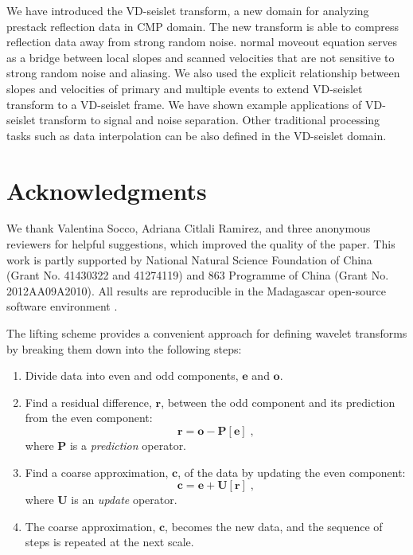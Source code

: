 We have introduced the VD-seislet transform, a new domain for
analyzing prestack reflection data in CMP domain. The new transform is
able to compress reflection data away from strong random
noise.   normal moveout
equation serves as a bridge between local slopes and scanned
velocities that are not sensitive to strong random noise and
aliasing. We also used the explicit relationship between slopes and
velocities of primary and multiple events to extend VD-seislet
transform to a VD-seislet frame. We have shown example applications of
VD-seislet transform to signal and noise separation. Other traditional
processing tasks such as data interpolation can be
also   defined in the VD-seislet domain.

\section{Acknowledgments}
We thank Valentina Socco, Adriana Citlali Ramirez, and three anonymous
reviewers for helpful suggestions, which improved the quality of the
paper. This work is partly supported by National Natural Science
Foundation of China (Grant No. 41430322 and 41274119) and 863
Programme of China (Grant No. 2012AA09A2010). All results are
reproducible in the Madagascar open-source software environment
\cite[]{m8r}.


The lifting scheme \cite[]{Sweldens95} provides a convenient approach
for defining wavelet transforms by breaking them down into the
following steps:
\begin{enumerate}
\item Divide data into even and odd components, $\mathbf{e}$ and
  $\mathbf{o}$.
\item Find a residual difference, $\mathbf{r}$, between the odd
  component and its prediction from the even component:
  \begin{equation}
    \label{eq:c}
    \mathbf{r}  = \mathbf{o} - \mathbf{P[e]}\;,
  \end{equation}
  where $\mathbf{P}$ is a \emph{prediction} operator.
\item Find a coarse approximation, $\mathbf{c}$, of the data by
  updating the even component:
  \begin{equation}
    \label{eq:r}
    \mathbf{c}  = \mathbf{e} + \mathbf{U[r]}\;,
  \end{equation}
  where $\mathbf{U}$ is an \emph{update} operator.
\item The coarse approximation, $\mathbf{c}$, becomes the new
  data, and the sequence of steps is repeated at the next scale.
\end{enumerate}

